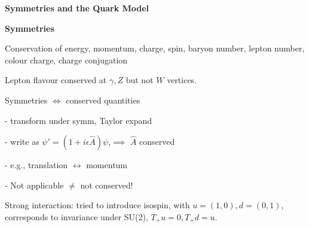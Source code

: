 \textbf{Symmetries and the Quark Model}

\textbf{Symmetries}

Conservation of energy, momentum, charge, spin, baryon number, lepton number, colour charge, charge conjugation

Lepton flavour conserved at $\gamma, Z$ but not $W$ vertices.

Symmetries $\iff$ conserved quantities

- transform under symm, Taylor expand

- write as $\psi' = (1 + i\epsilon \hat{A})\psi$,$\implies$ $\hat{A}$ conserved

- e.g., translation $\leftrightarrow$ momentum

- Not applicable $\neq$ not conserved!

Strong interaction: tried to introduce isospin, with $u = (1,0), d=(0,1)$, corresponds to invariance under SU(2), $T_+ u = 0, T_+ d = u$.




